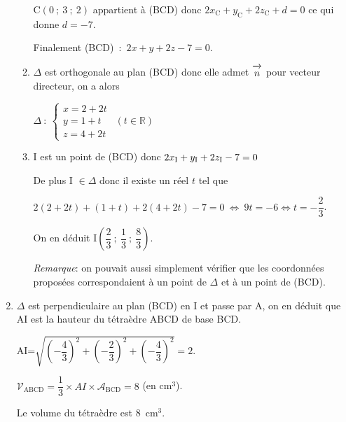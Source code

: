 \documentclass[11pt,a4paper,answers,fancyhdr]{exam}
\newcommand{\vect}[1]{\overrightarrow{\,\mathstrut#1\,}}
\newcommand{\equi}{\Longleftrightarrow}
\newcommand{\R}{\mathbb{R}}
\newcommand{\x}{\times}
\begin{document}
\begin{enumerate}
\begin{enumerate}
\begin{solution}
C$(0~;~3~;~2)$ appartient à (BCD) donc $2x_{\text{C}}+y_{\text{C}}+2z_{\text{C}}+d=0$ ce qui donne $d = -7$.
		
Finalement (BCD)~:~$2x+y+2z-7= 0$.
		\end{solution}
		
		\item %

\begin{solution}
$\Delta$ est orthogonale au plan (BCD) donc elle admet $\vect{n}$ pour vecteur directeur, on a alors

$\Delta~:~\begin{cases}
x=2+2t\\y=1+t\\z=4+2t
\end{cases}~~(t\in \R)$

\end{solution}

		\item %

\begin{solution}
I est un point de (BCD) donc $2x_{\text
I}+y_{\text
I}+2z_{\text
I}-7=0$ 

De plus I $\in \Delta$ donc il existe un réel $t$ tel que 

$2(2+2t)+(1+t)+2(4+2t)-7=0~\equi~9t=-6 \equi t=-\dfrac{2}{3}$.

On en déduit I$\left(\dfrac{2}{3}~;~\dfrac{1}{3}~;~\dfrac{8}{3}\right)$.

\emph{Remarque}: on pouvait aussi simplement vérifier que les coordonnées proposées correspondaient à un point de $\Delta$ et à un point de (BCD).
\end{solution}

	\end{enumerate}
\item  %

\begin{solution}
$\Delta$ est perpendiculaire au plan (BCD) en I et passe par A, on en déduit que AI est la hauteur du tétraèdre ABCD de base BCD. 

AI=$\sqrt{\left(-\dfrac{4}{3} \right)^2+\left(-\dfrac{2}{3} \right)^2+\left(-\dfrac{4}{3} \right)^2}=2$.

$\mathcal{V}_{\text{ABCD}}=\dfrac{1}{3}\x AI \x \mathcal{A}_{\text{BCD}}=8$ (en cm$^3$).

Le volume du tétraèdre est 8~cm$^3$.
\end{solution}

\end{enumerate}
\end{document}
